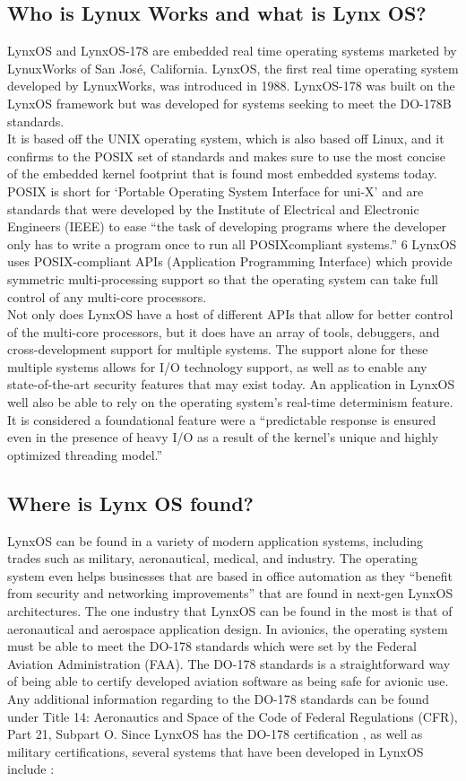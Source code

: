 \documentclass[12pt]{article}
\begin{document}
\subsection{Who is Lynux Works and what is Lynx OS?}
LynxOS and LynxOS-178 are embedded real time operating systems marketed by
LynuxWorks of San José, California. LynxOS, the first real time operating system
developed by LynuxWorks, was introduced in 1988. LynxOS-178 was built on the
LynxOS framework but was developed for systems seeking to meet the DO-178B
standards.\\
 It is based off the UNIX operating system,
which is also based off Linux, and it confirms to the POSIX set of standards and makes sure to
use the most concise of the embedded kernel footprint that is found most embedded systems
today. POSIX is short for ‘Portable Operating System Interface for uni-X’ and are standards that
were developed by the Institute of Electrical and Electronic Engineers (IEEE) to ease “the task of
developing programs where the developer only has to write a program once to run all POSIXcompliant systems.” 6 LynxOS uses POSIX-compliant APIs (Application Programming
Interface) which provide symmetric multi-processing support so that the operating system can
take full control of any multi-core processors.\\
Not only does LynxOS have a host of different APIs that allow for better control of the
multi-core processors, but it does have an array of tools, debuggers, and cross-development
support for multiple systems. The support alone for these multiple systems allows for I/O
technology support, as well as to enable any state-of-the-art security features that may exist
today. An application in LynxOS well also be able to rely on the operating system’s real-time
determinism feature. It is considered a foundational feature were a “predictable response is
ensured even in the presence of heavy I/O as a result of the kernel’s unique and highly optimized
threading model.”\\
\subsection{Where is Lynx OS found?}
LynxOS can be found in a variety of modern application systems, including trades such
as military, aeronautical, medical, and industry. The operating system even helps businesses that
are based in office automation as they “benefit from security and networking
improvements”
that are found in next-gen LynxOS architectures. The one industry that LynxOS can be found in the most is that of aeronautical and aerospace application design. In avionics, the
operating system must be able to meet the DO-178 standards which were set by the Federal
Aviation Administration (FAA). The DO-178 standards is a straightforward way of being able to
certify developed aviation software as being safe for avionic use. Any additional information
regarding to the DO-178 standards can be found under Title 14: Aeronautics and Space of the
Code of Federal Regulations (CFR), Part 21, Subpart O. Since LynxOS has the DO-178
certification
, as well as military certifications, several systems that have been developed in
LynxOS include \cite{ref:six}:
\end{document}
